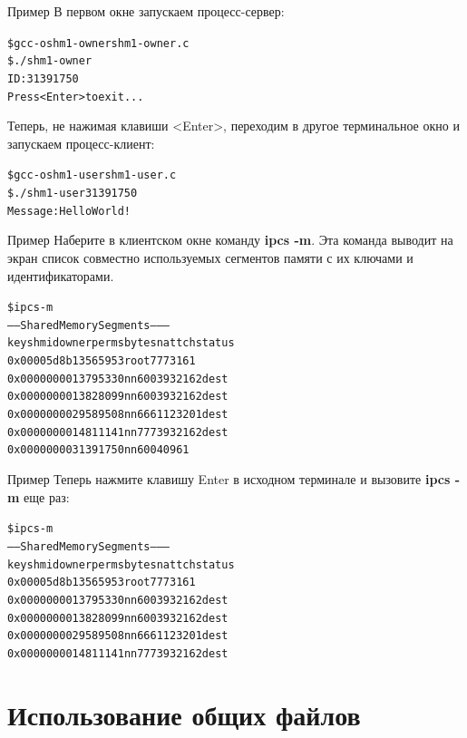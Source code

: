 \documentclass[xcolor=table]{beamer}
\begin{document}
\begin{frame}[fragile]{Пример}
	В первом окне запускаем процесс-сервер:
	\begin{alltt}
\$ gcc -o shm1-owner shm1-owner.c
\$ ./shm1-owner
ID: 31391750
Press <Enter> to exit...
	\end{alltt}
	Теперь, не нажимая клавиши <Enter>, переходим в другое терминальное окно и запускаем процесс-клиент:
	\begin{alltt}
\$ gcc -o shm1-user shm1-user.c
\$ ./shm1-user 31391750
Message: Hello World!
	\end{alltt}
\end{frame}

\begin{frame}[fragile]{Пример}
	Наберите в клиентском окне команду \textbf{ipcs -m}. Эта команда выводит на экран список совместно используемых сегментов памяти с их ключами и идентификаторами. 
\begin{alltt}
\$ ipcs -m
------ Shared Memory Segments --------
key shmid owner perms bytes nattch status
0x00005d8b 13565953 root 777 316 1
0x00000000 13795330 nn 600 393216 2 dest
0x00000000 13828099 nn 600 393216 2 dest
0x00000000 29589508 nn 666 112320 1 dest
0x00000000 14811141 nn 777 393216 2 dest
0x00000000 31391750 nn 600 4096 1
\end{alltt}
\end{frame}

\begin{frame}[fragile]{Пример}
Теперь нажмите клавишу Enter в исходном терминале и вызовите \textbf{ipcs -m} еще раз:
\begin{alltt}
\$ ipcs -m
------ Shared Memory Segments --------
key shmid owner perms bytes nattch status
0x00005d8b 13565953 root 777 316 1
0x00000000 13795330 nn 600 393216 2 dest
0x00000000 13828099 nn 600 393216 2 dest
0x00000000 29589508 nn 666 112320 1 dest
0x00000000 14811141 nn 777 393216 2 dest
\end{alltt}
\end{frame}

\section{Использование общих файлов}
\end{document}
